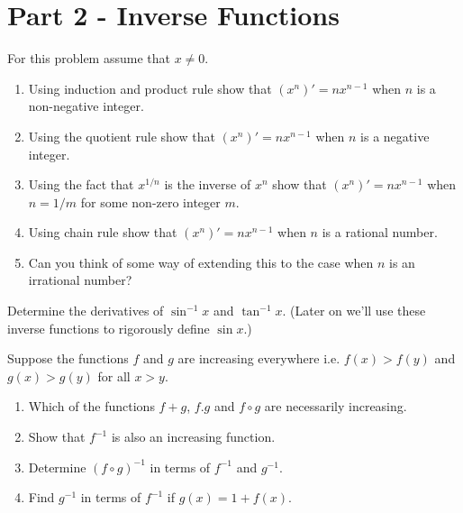 \documentclass[9pt, a4paper, oneside]{amsart}
\begin{document}
\newpage
\section*{Part 2 - Inverse Functions}
\begin{questions}[resume]
	\item For this problem assume that $ x \neq 0$.
	\begin{enumerate}
		\item Using induction and product rule show that $ (x^n)' = n x^{n-1}$ when $ n$ is a non-negative integer.
		\item Using the quotient rule show that $ (x^n)' = n x^{n-1}$ when $ n$ is a negative integer.
		\item Using the fact that $ x^{1/n}$ is the inverse of $ x^n$ show that $ (x^n)' = n x^{n-1}$ when $ n = 1/m$ for some non-zero integer $ m$.
		\item Using chain rule show that $ (x^n)' = n x^{n-1}$ when $ n$ is a rational number.
		\item Can you think of some way of extending this to the case when $ n$ is an irrational number?
	\end{enumerate}

	\item Determine the derivatives of $ \sin^{-1}x$ and $ \tan^{-1}x$. (Later on we'll use these inverse functions to rigorously define $ \sin x$.)

	\item Suppose the functions $ f$ and $ g$ are increasing everywhere i.e. $ f(x) > f(y)$ and $ g(x) > g(y)$ for all $ x > y$.
	\begin{enumerate}
		\item Which of the functions $ f+g$, $ f.g$ and $ f \circ g$ are necessarily increasing.
		\item Show that $ f^{-1}$ is also an increasing function.
		\item Determine $ (f \circ g)^{-1}$ in terms of $ f^{-1}$ and $ g^{-1}$.
		\item Find $ g^{-1}$ in terms of $ f^{-1}$ if $ g(x) = 1+ f(x)$.
	\end{enumerate}

\end{questions}



\end{document}
